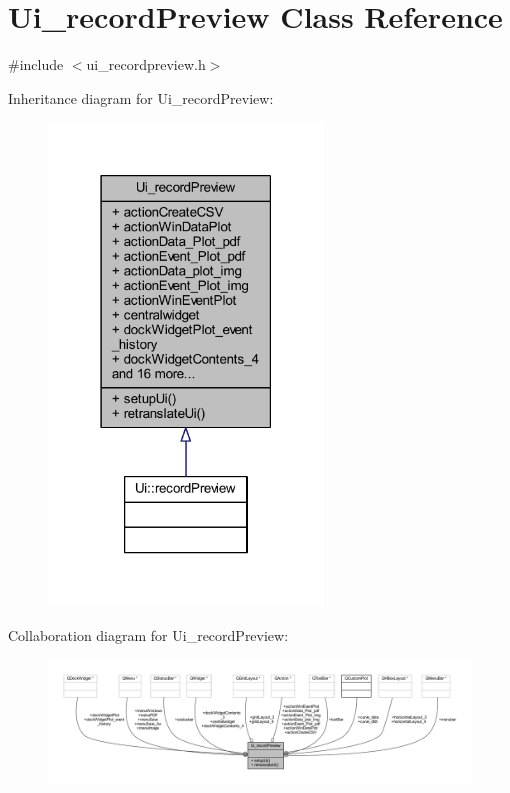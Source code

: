 \hypertarget{a00081}{\section{Ui\+\_\+record\+Preview Class Reference}
\label{a00081}
}


{\ttfamily \#include $<$ui\+\_\+recordpreview.\+h$>$}



Inheritance diagram for Ui\+\_\+record\+Preview\+:
\nopagebreak
\begin{figure}[H]
\begin{center}
\leavevmode
\includegraphics[width=207pt]{df/d3a/a00571}
\end{center}
\end{figure}


Collaboration diagram for Ui\+\_\+record\+Preview\+:
\nopagebreak
\begin{figure}[H]
\begin{center}
\leavevmode
\includegraphics[width=350pt]{d6/d06/a00572}
\end{center}
\end{figure}
